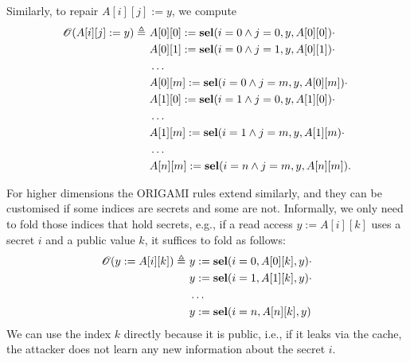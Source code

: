 Similarly, to repair $A[i][j]:=y$, we compute
\begin{align*}
    \mathscr{O}(A[i][j]:=y)\triangleq\  
    &A[0][0]:=\textbf{sel}(i=0\land j=0,y,A[0][0])\cdot \\
    &A[0][1]:=\textbf{sel}(i=0\land j=1,y,A[0][1])\cdot \\
    &\ldots\\
    &A[0][m]:=\textbf{sel}(i=0\land j=m,y,A[0][m])\cdot \\
    &A[1][0]:=\textbf{sel}(i=1\land j=0,y,A[1][0])\cdot \\
    &\ldots\\
    &A[1][m]:=\textbf{sel}(i=1\land j=m,y,A[1][m)\cdot \\
    &\ldots\\
    &A[n][m]:=\textbf{sel}(i=n\land j=m,y,A[n][m]).
\end{align*}

For higher dimensions the ORIGAMI rules extend similarly, and they can be customised if some indices are secrets and some are not. Informally, we only need to fold those indices that hold secrets, e.g., if a read access $y:=A[i][k]$ uses a secret $i$ and a public value $k$, it suffices to fold as follows: 
\begin{align*}
    \mathscr{O}(y:=A[i][k])\triangleq\  
    &y:=\sel(i=0,A[0][k],y)\cdot \\
    &y:=\sel(i=1,A[1][k],y)\cdot \\
    &\ldots\\
    &y:=\sel(i=n,A[n][k],y)%
\end{align*}
We can use the index $k$ directly because it is public, i.e., if it leaks via the cache, the attacker does not learn any new information about the secret $i$.

